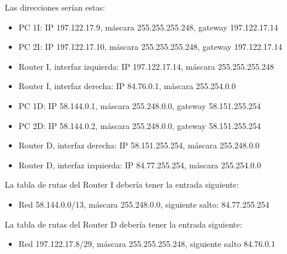 \documentclass[letterpaper,10pt,spanish]{sphinxmanual}
\begin{document}
\sphinxAtStartPar
Las direcciones serían estas:
\begin{itemize}
\item {} 
\sphinxAtStartPar
PC 1I: IP 197.122.17.9, máscara 255.255.255.248, gateway 197.122.17.14

\item {} 
\sphinxAtStartPar
PC 2I: IP 197.122.17.10, máscara 255.255.255.248, gateway 197.122.17.14

\item {} 
\sphinxAtStartPar
Router I, interfaz izquierda: IP 197.122.17.14, máscara 255.255.255.248

\item {} 
\sphinxAtStartPar
Router I, interfaz derecha: IP 84.76.0.1, máscara 255.254.0.0

\item {} 
\sphinxAtStartPar
PC 1D: IP 58.144.0.1, máscara 255.248.0.0, gateway 58.151.255.254

\item {} 
\sphinxAtStartPar
PC 2D: IP 58.144.0.2, máscara 255.248.0.0, gateway 58.151.255.254

\item {} 
\sphinxAtStartPar
Router D, interfaz derecha: IP 58.151.255.254, máscara 255.248.0.0

\item {} 
\sphinxAtStartPar
Router D, interfaz izquierda: IP 84.77.255.254, máscara 255.254.0.0

\end{itemize}

\sphinxAtStartPar
La tabla de rutas del Router I debería tener la entrada siguiente:
\begin{itemize}
\item {} 
\sphinxAtStartPar
Red 58.144.0.0/13, máscara 255.248.0.0, siguiente salto: 84.77.255.254

\end{itemize}

\sphinxAtStartPar
La tabla de rutas del Router D debería tener la entrada siguiente:
\begin{itemize}
\item {} 
\sphinxAtStartPar
Red 197.122.17.8/29, máscara 255.255.255.248, siguiente salto 84.76.0.1

\end{itemize}
\end{document}
